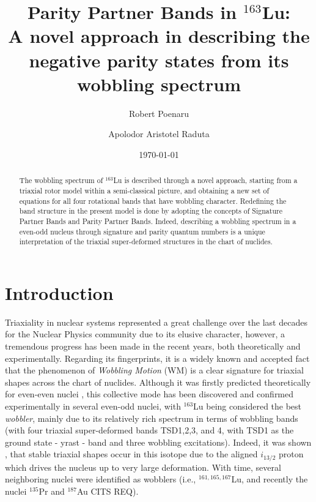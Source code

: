 \documentclass[%
 reprint,
 amsmath,
 amssymb,
 aps,
]{revtex4-2}
\begin{document}
\title{Parity Partner Bands in $^{163}$Lu: \\ A novel approach in describing the negative parity states from its wobbling spectrum}%

\author{Robert Poenaru}%
\author{Apolodor Aristotel Raduta}%
%
%

\date{\today}

\begin{abstract}
The wobbling spectrum of $^{163}$Lu is described through a novel approach, starting from a triaxial rotor model within a semi-classical picture, and obtaining a new set of equations for all four rotational bands that have wobbling character. Redefining the band structure in the present model is done by adopting the concepts of Signature Partner Bands and Parity Partner Bands. Indeed, describing a wobbling spectrum in a even-odd nucleus through signature and parity quantum numbers is a unique interpretation of the triaxial super-deformed structures in the chart of nuclides.
\end{abstract}

\maketitle


\section{Introduction}

Triaxiality in nuclear systems represented a great challenge over the last decades for the Nuclear Physics community due to its elusive character, however, a tremendous progress has been made in the recent years, both theoretically and experimentally. Regarding its fingerprints, it is a widely known and accepted fact that the phenomenon of \emph{Wobbling Motion} (WM) is a clear signature for triaxial shapes across the chart of nuclides. Although it was firstly predicted theoretically for even-even nuclei \cite{bohr1998nuclear}, this collective mode has been discovered and confirmed experimentally in several even-odd nuclei, with $^{163}$Lu being considered the best \emph{wobbler}, mainly due to its relatively rich spectrum in terms of wobbling bands (with four triaxial super-deformed bands TSD1,2,3, and 4, with TSD1 as the ground state - yrast - band and three wobbling excitations). Indeed, it was shown \cite{odegaard2001evidence}, \cite{jensen2002wobbling} that stable triaxial shapes occur in this isotope due to the aligned $i_{13/2}$ proton which drives the nucleus up to very large deformation. With time, several neighboring nuclei were identified as wobblers (i.e., $^{161,165,167}$Lu, and recently the nuclei $^{135}$Pr and $^{187}$Au {\color{red}CITS REQ}).
\end{document}
